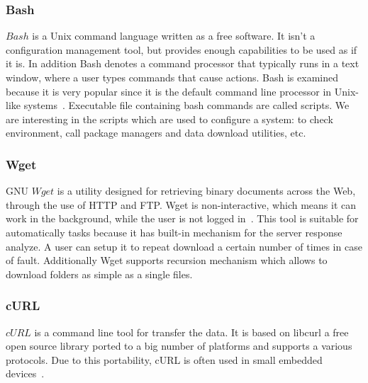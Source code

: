 \subsubsection*{Bash} \label{lang:bash}
$Bash$ is a Unix command language written as a free software.
It isn't a configuration management tool, but provides enough capabilities to be used as if it is.
In addition Bash denotes a command processor that typically runs in a text window, where a user types commands that cause actions.
Bash is examined because it is very popular since it is the default command line processor in Unix-like systems~\cite*{bashdef}.
Executable file containing bash commands are called scripts.
We are interesting in the scripts which are used to configure a system: to check environment, call package managers and data download utilities, etc.

\subsubsection*{Wget}
GNU $Wget$ is a utility designed for retrieving binary documents across the Web, through the use of HTTP and FTP.
Wget is non-interactive, which means it can work in the background, while the user is not logged in~\cite{wget_desc}.
This tool is suitable for automatically  tasks because it has built-in mechanism for the server response analyze.
A user can setup it to repeat download a certain number of times in case of fault.
Additionally Wget supports recursion mechanism which allows to download folders as simple as a single files.
\subsubsection*{cURL}
$cURL$ is a command line tool for transfer the data.
 It is based on libcurl a free open source library ported to a big number of platforms and supports a various protocols.
Due to this portability, cURL is often used in small embedded devices~\cite{curl}.